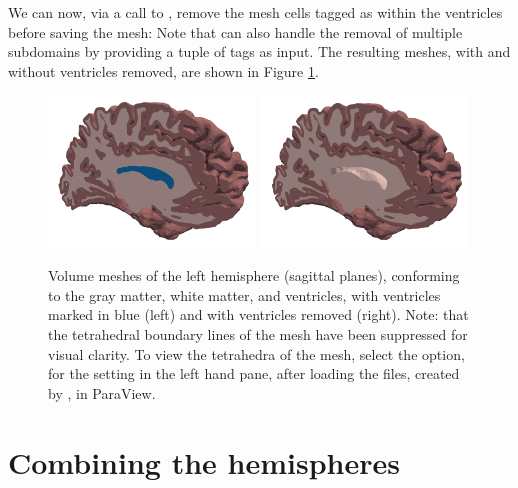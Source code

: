 We can now, via a call to \svmtk{} ,
remove the mesh cells tagged as within the ventricles before saving
the mesh:
Note that  can also handle the removal of
multiple subdomains by providing a tuple of tags as input. The resulting
meshes, with and without ventricles removed, are shown in Figure
\ref{fig:chp4:tags-with-without-ventricles}.
\begin{center}
\begin{figure}
  \includegraphics[width=0.49\textwidth]{./graphics/chp4/ernie-final-comp-b}
  \includegraphics[width=0.49\textwidth]{./graphics/chp4/ernie-final-comp-d}
    \caption{Volume meshes of the left hemisphere (sagittal planes),
      conforming to the gray matter, white matter, and ventricles, with
      ventricles marked in blue (left) and with ventricles removed (right).  
	Note: that the tetrahedral boundary lines of the mesh have been 
	suppressed for visual clarity.  To view the tetrahedra of the mesh, 
	select the  option, for the  
	setting in the left hand pane, after loading the  files, 
	created by , in ParaView. 
	}
    \label{fig:chp4:tags-with-without-ventricles}
\end{figure}
\end{center}

\section{Combining the hemispheres}
\label{sec:chp4-left-right-tagged}

